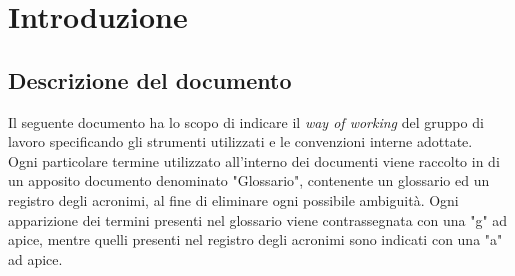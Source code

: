 \section{Introduzione}
\subsection{Descrizione del documento}
Il  seguente documento ha lo scopo di indicare il \textit{way of working} del gruppo di lavoro specificando gli strumenti utilizzati e le convenzioni interne adottate.\\
\noindent
Ogni particolare termine utilizzato all'interno dei documenti viene raccolto in di un apposito documento denominato "Glossario", contenente un glossario ed un registro degli acronimi, al fine di eliminare ogni possibile ambiguità.
Ogni apparizione dei termini presenti nel glossario viene contrassegnata con una "g" ad apice, mentre quelli presenti nel registro degli acronimi sono indicati con una "a" ad apice.
